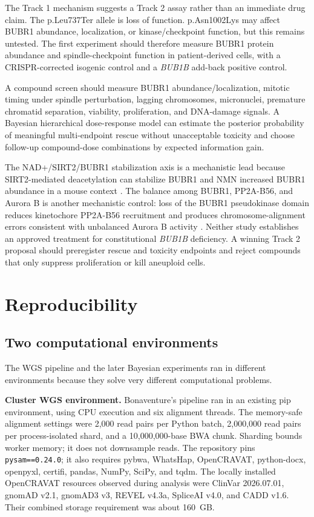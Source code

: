 \documentclass[11pt]{article}
\newcommand{\code}[1]{\texttt{#1}}
\begin{document}
The Track 1 mechanism suggests a Track 2 assay rather than an immediate drug claim. The p.Leu737Ter allele is loss of function. p.Asn1002Lys may affect BUBR1 abundance, localization, or kinase/checkpoint function, but this remains untested. The first experiment should therefore measure BUBR1 protein abundance and spindle-checkpoint function in patient-derived cells, with a CRISPR-corrected isogenic control and a \textit{BUB1B} add-back positive control.

A compound screen should measure BUBR1 abundance/localization, mitotic timing under spindle perturbation, lagging chromosomes, micronuclei, premature chromatid separation, viability, proliferation, and DNA-damage signals. A Bayesian hierarchical dose-response model can estimate the posterior probability of meaningful multi-endpoint rescue without unacceptable toxicity and choose follow-up compound-dose combinations by expected information gain.

The NAD+/SIRT2/BUBR1 stabilization axis is a mechanistic lead because SIRT2-mediated deacetylation can stabilize BUBR1 and NMN increased BUBR1 abundance in a mouse context \citep{sirt2bubr12014}. The balance among BUBR1, PP2A-B56, and Aurora B is another mechanistic control: loss of the BUBR1 pseudokinase domain reduces kinetochore PP2A-B56 recruitment and produces chromosome-alignment errors consistent with unbalanced Aurora B activity \citep{bubr1pp2a2020}. Neither study establishes an approved treatment for constitutional \textit{BUB1B} deficiency. A winning Track 2 proposal should preregister rescue and toxicity endpoints and reject compounds that only suppress proliferation or kill aneuploid cells.

\section{Reproducibility}

\subsection{Two computational environments}

The WGS pipeline and the later Bayesian experiments ran in different environments because they solve very different computational problems.

\textbf{Cluster WGS environment.} Bonaventure's pipeline \citep{dossourepo2026} ran in an existing pip environment, using CPU execution and six alignment threads. The memory-safe alignment settings were 2,000 read pairs per Python batch, 2,000,000 read pairs per process-isolated shard, and a 10,000,000-base BWA chunk. Sharding bounds worker memory; it does not downsample reads. The repository pins \code{pysam==0.24.0}; it also requires pybwa, WhatsHap, OpenCRAVAT, python-docx, openpyxl, certifi, pandas, NumPy, SciPy, and tqdm. The locally installed OpenCRAVAT resources observed during analysis were ClinVar 2026.07.01, gnomAD v2.1, gnomAD3 v3, REVEL v4.3a, SpliceAI v4.0, and CADD v1.6. Their combined storage requirement was about 160~GB.
\end{document}
